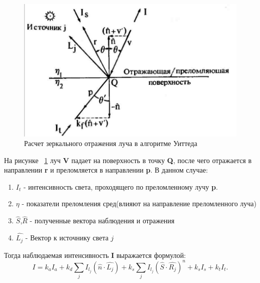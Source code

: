 \documentclass[a4paper,14pt,unknownkeysallowed]{extreport}
\begin{document}
\begin{figure}[h]
	\centering
	\includegraphics{global_reflections}
	\caption{Расчет зеркального отражения луча в алгоритме Уиттеда}
	\label{fig:global_reflections}
\end{figure} 

На рисунке ~\ref{fig:global_reflections} луч \textbf{V} падает на поверхность в точку \textbf{Q}, после чего отражается в направлении \textbf{r} и преломляется
в направлении \textbf{p}.
В данном случае:
\begin{enumerate}
	\item $I_t$ - интенсивность света, проходящего по преломленному лучу \textbf{p}.
	\item $\eta$ - показатели преломления сред(влияют на направление преломленного луча)
	\item $\hat{S}$,$\hat{R}$ - полученные вектора наблюдения и отражения
	\item $\hat{L_j}$ - Вектор к источнику света $j$

\end{enumerate}

Тогда наблюдаемая интенсивность \textbf{I} выражается формулой:
\begin{equation} 
	I = k_aI_a + k_d \sum_{j} I_{l_j}(\hat{n} \cdot \hat{L_j}) + k_s \sum_{j} I_{l_j}(\hat{S} \cdot \hat{R_j})^n + k_sI_s + k_tI_t.
	\label{eq:intensivity}
\end{equation}
\end{document}
